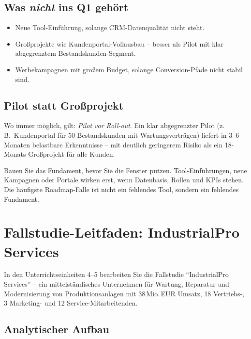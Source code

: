 \documentclass[11pt,a4paper,oneside]{article}
\begin{document}
\subsection{Was \emph{nicht} ins Q1 gehört}

\begin{itemize}
  \item Neue Tool-Einführung, solange CRM-Datenqualität nicht steht.
  \item Großprojekte wie Kundenportal-Vollausbau -- besser als Pilot mit klar abgegrenztem Bestandskunden-Segment.
  \item Werbekampagnen mit großem Budget, solange Conversion-Pfade nicht stabil sind.
\end{itemize}

\subsection{Pilot statt Großprojekt}

Wo immer möglich, gilt: \emph{Pilot vor Roll-out}. Ein klar abgegrenzter Pilot (z.\,B.\ Kundenportal für 50 Bestandskunden mit Wartungsverträgen) liefert in 3--6 Monaten belastbare Erkenntnisse -- mit deutlich geringerem Risiko als ein 18-Monats-Großprojekt für alle Kunden.

\begin{merkbox}
Bauen Sie das Fundament, bevor Sie die Fenster putzen. Tool-Einführungen, neue Kampagnen oder Portale wirken erst, wenn Datenbasis, Rollen und KPIs stehen. Die häufigste Roadmap-Falle ist nicht ein fehlendes Tool, sondern ein fehlendes Fundament.
\end{merkbox}

\section{Fallstudie-Leitfaden: IndustrialPro Services}

In den Unterrichtseinheiten 4--5 bearbeiten Sie die Fallstudie ``IndustrialPro Services'' -- ein mittelständisches Unternehmen für Wartung, Reparatur und Modernisierung von Produktionsanlagen mit 38\,Mio.\,EUR Umsatz, 18 Vertriebs-, 3 Marketing- und 12 Service-Mitarbeitenden.

\subsection{Analytischer Aufbau}
\end{document}
